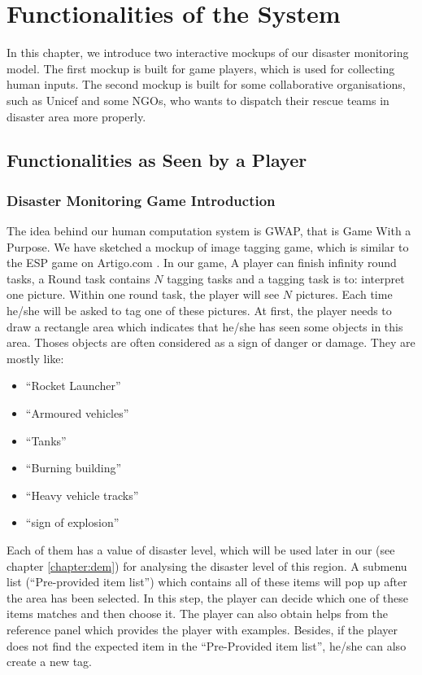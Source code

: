 \section{Functionalities of the System}

In this chapter,
we introduce two interactive mockups of our disaster monitoring model.
The first mockup is built for game players,
which is used for collecting human inputs.
The second mockup is built for some collaborative organisations,
such as Unicef and some NGOs,
who wants to dispatch their rescue teams in disaster area more properly. 

  \subsection{Functionalities as Seen by a Player}
      \subsubsection{Disaster Monitoring Game Introduction}
      The idea behind our human computation system is GWAP,
      that is Game With a Purpose.
      We have sketched a mockup of image tagging game,
      which is similar to the ESP game on Artigo.com \cite{wieser2013artigo}.
      In our game,
      A player can finish infinity round tasks, 
      a Round task contains $N$ tagging tasks and a tagging task is to:
      interpret one picture.
      Within one round task, the player will see $N$ pictures.
      Each time he/she will be asked to tag one of these pictures.
      At first,
      the player needs to draw a rectangle area which indicates that he/she has seen some objects in this area.
      Thoses objects are often considered as a sign of danger or damage.
      They are mostly like:
      
      \begin{itemize}
        \item ``Rocket Launcher''
        \item ``Armoured vehicles''
        \item ``Tanks''
        \item ``Burning building''
        \item ``Heavy vehicle tracks''
        \item ``sign of explosion''
      \end{itemize}

      Each of them has a value of disaster level, 
      which will be used later in our (see chapter \ref{chapter:dem}) for analysing the disaster level of this region.
      A submenu list (``Pre-provided item list'') which contains all of these items will pop up after the area has been selected.
      In this step,
      the player can decide which one of these items matches and then choose it.
      The player can also obtain helps from the reference panel which provides the player with examples.
      Besides, 
      if the player does not find the expected item in the ``Pre-Provided item list'',
      he/she can also create a new tag.

